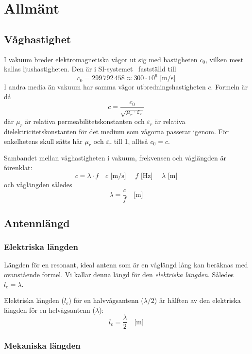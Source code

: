 \newpage
\section{Allmänt}
\label{sec:antennsystem-allmaent}

\subsection{Våghastighet}
\label{ljushastigheten}

I vakuum breder elektromagnetiska vågor ut sig med hastigheten \(c_0\), vilken
mest kallas ljushastigheten.
Den är i SI-systemet~\cite{SIbrochure8} fastställd till
\[c_0 = 299\,792\,458 \approx 300 \cdot 10^6 \text{ [m/s]}\]
I andra media än vakuum har samma vågor utbredningshastigheten \(c\).
Formeln är då
\[c = \frac{c_0}{\sqrt{\mu_r \cdot \varepsilon_r}}\]
där \(\mu_r\) är relativa permeabilitetskonstanten och \(\varepsilon_r\) är
relativa dielektricitetskonstanten för det medium som vågorna passerar igenom.
För enkelhetens skull sätts här \(\mu_r\) och \(\varepsilon_r\) till 1,
alltså \(c_0 = c\).

Sambandet mellan våghastigheten i vakuum, frekvensen och våglängden är förenklat:
\[ c = \lambda \cdot f \quad c\text{ [m/s] }\quad f\text{ [Hz] } \quad \lambda\text{ [m]}\]
och våglängden således
\[ \lambda = \frac{c}{f} \quad \text{[m]} \]

\subsection{Antennlängd}

\subsubsection{Elektriska längden}

Längden för en resonant, ideal antenn som är en våglängd lång kan beräknas med
ovanstående formel.
Vi kallar denna längd för den \emph{elektriska längden}.
Således \(l_e = \lambda\).

Elektriska längden (\(l_e\)) för en halvvågsantenn (\(\lambda/2\)) är hälften
av den elektriska längden för en helvågsantenn (\(\lambda\)):
\[l_e = \frac{\lambda}{2} \quad \text{[m]}\]

\subsubsection{Mekaniska längden}


